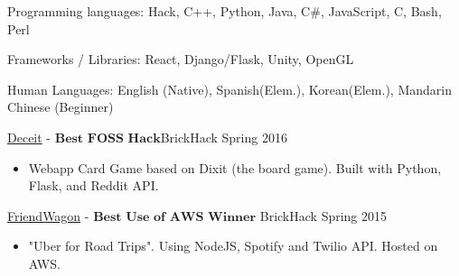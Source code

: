 \documentclass[11pt]{article}
\begin{document}
\inlineskillsection  %
{Programming languages:}
{ Hack, C++, Python, Java, C\#, JavaScript, C, Bash, Perl }

\inlineskillsection  
{Frameworks / Libraries:}
{ React, Django/Flask, Unity, OpenGL}

\inlineskillsection
{Human Languages:}
{English (Native), Spanish(Elem.), Korean(Elem.), Mandarin Chinese (Beginner)}


\spacedhrule{0.2em}{0.2em}  %

\projects
{{\href{https://github.com/gabeochoa/sokim}{Deceit}} - $\textbf{Best FOSS Hack}$}{BrickHack Spring 2016}
{
    \begin{itemize}[label={}]
        \setlength\itemsep{.005ex}
        \item{Webapp Card Game based on Dixit (the board game). Built with Python, Flask, and Reddit API.}
    \end{itemize}
}

\headedsubsection
{{\href{https://github.com/alanplotko/RoadTrip}{FriendWagon}} - $\textbf{Best Use of AWS Winner}$ }
{BrickHack Spring 2015}
{
    \begin{itemize}[label={}]
    	\setlength\itemsep{.005ex}
        \item{"Uber for Road Trips". Using NodeJS, Spotify and Twilio API. Hosted on AWS.}
    \end{itemize}
}
\end{document}
